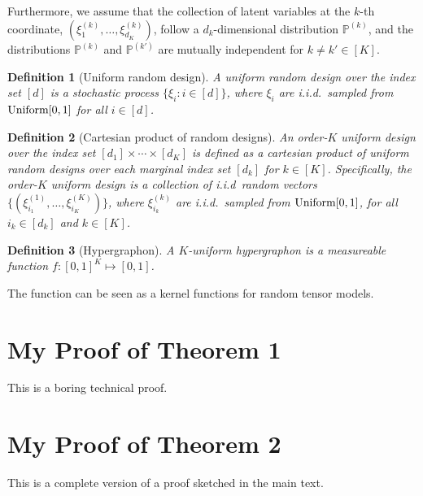 \documentclass[final,12pt]{colt2020} %
\newtheorem{defn}{Definition}
\begin{document}
Furthermore, we assume that the collection of latent variables at the $k$-th coordinate, $(\xi^{(k)}_1,\ldots,\xi^{(k)}_{d_K})$, follow a $d_k$-dimensional distribution $\mathbb{P}^{(k)}$, and the distributions $\mathbb{P}^{(k)}$ and $\mathbb{P}^{(k')}$ are mutually independent for $k\neq k' \in[K]$.

\begin{defn}[Uniform random design] A uniform random design over the index set $[d]$ is a stochastic process $\{\xi_i\colon i\in[d]\}$, where $\xi_i$ are i.i.d.\ sampled from $\textup{Uniform}[0,1]$ for all $i\in[d]$.
\end{defn}

\begin{defn}[Cartesian product of random designs] An order-$K$ uniform design over the index set $[d_1]\times \cdots \times [d_K]$ is defined as a cartesian product of uniform random designs over each marginal index set $[d_k]$ for $k\in[K]$. Specifically, the order-$K$ uniform design is a collection of i.i.d\ random vectors $\{(\xi^{(1)}_{i_1},\ldots,\xi^{(K)}_{i_K})\}$, where $\xi^{(k)}_{i_k}$ are i.i.d.\ sampled from $\textup{Uniform}[0,1]$, for all $i_k\in[d_k]$ and $k\in[K]$.
\end{defn}

\begin{defn}[Hypergraphon] A $K$-uniform hypergraphon is a measureable function $f\colon [0,1]^K\mapsto [0,1]$. 
\end{defn}
The function can be seen as a kernel functions for random tensor models. 




\appendix

\section{My Proof of Theorem 1}

This is a boring technical proof.

\section{My Proof of Theorem 2}

This is a complete version of a proof sketched in the main text.
\end{document}
